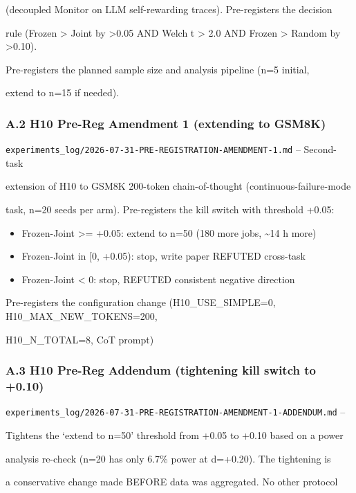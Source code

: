 \documentclass[
]{article}
\begin{document}
(decoupled Monitor on LLM self-rewarding traces). Pre-registers the
decision

rule (Frozen \textgreater{} Joint by \textgreater0.05 AND Welch t
\textgreater{} 2.0 AND Frozen \textgreater{} Random by
\textgreater0.10).

Pre-registers the planned sample size and analysis pipeline (n=5
initial,

extend to n=15 if needed).

\subsubsection{A.2 H10 Pre-Reg Amendment 1 (extending to
GSM8K)}\label{a.2-h10-pre-reg-amendment-1-extending-to-gsm8k}

\texttt{experiments\_log/2026-07-31-PRE-REGISTRATION-AMENDMENT-1.md} --
Second-task

extension of H10 to GSM8K 200-token chain-of-thought
(continuous-failure-mode

task, n=20 seeds per arm). Pre-registers the kill switch with threshold
+0.05:

\begin{itemize}
\item
  Frozen-Joint \textgreater= +0.05: extend to n=50 (180 more jobs,
  \textasciitilde14 h more)
\item
  Frozen-Joint in {[}0, +0.05): stop, write paper REFUTED cross-task
\item
  Frozen-Joint \textless{} 0: stop, REFUTED consistent negative
  direction
\end{itemize}

Pre-registers the configuration change (H10\_USE\_SIMPLE=0,
H10\_MAX\_NEW\_TOKENS=200,

H10\_N\_TOTAL=8, CoT prompt)

\subsubsection{A.3 H10 Pre-Reg Addendum (tightening kill switch to
+0.10)}\label{a.3-h10-pre-reg-addendum-tightening-kill-switch-to-0.10}

\texttt{experiments\_log/2026-07-31-PRE-REGISTRATION-AMENDMENT-1-ADDENDUM.md}
--

Tightens the `extend to n=50' threshold from +0.05 to +0.10 based on a
power

analysis re-check (n=20 has only 6.7\% power at d=+0.20). The tightening
is

a conservative change made BEFORE data was aggregated. No other protocol
\end{document}

